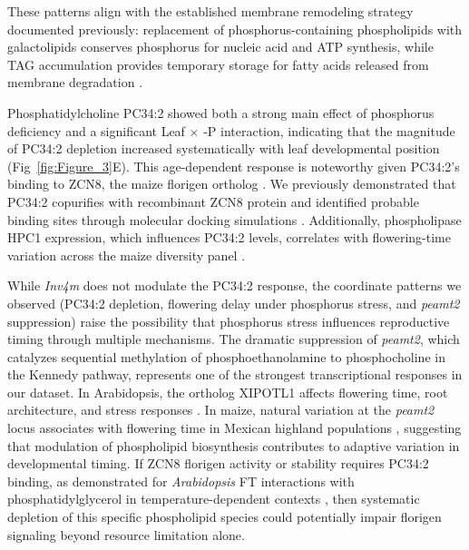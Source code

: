\documentclass[9pt,twocolumn,twoside]{rilabRxiv}
\newcommand{\invfour}{\textit{Inv4m}\xspace}
\begin{document}
These patterns align with the established membrane remodeling strategy documented previously: replacement of phosphorus-containing phospholipids with galactolipids conserves phosphorus for nucleic acid and ATP synthesis, while TAG accumulation provides temporary storage for fatty acids released from membrane degradation \cite{wang2020a}.

Phosphatidylcholine PC34:2 showed both a strong main effect of phosphorus deficiency and a significant Leaf $\times$ -P interaction, indicating that the magnitude of PC34:2 depletion increased systematically with leaf developmental position (Fig~\ref{fig:Figure_3}E).
This age-dependent response is noteworthy given PC34:2's binding to ZCN8, the maize florigen ortholog \cite{barnes2022}.
We previously demonstrated that PC34:2 copurifies with recombinant ZCN8 protein and identified probable binding sites through molecular docking simulations \cite{barnes2022}.
Additionally, phospholipase HPC1 expression, which influences PC34:2 levels, correlates with flowering-time variation across the maize diversity panel \cite{barnes2022}.

While \invfour does not modulate the PC34:2 response, the coordinate patterns we observed (PC34:2 depletion, flowering delay under phosphorus stress, and \textit{peamt2} suppression) raise the possibility that phosphorus stress influences reproductive timing through multiple mechanisms.
The dramatic suppression of \textit{peamt2}, which catalyzes sequential methylation of phosphoethanolamine to phosphocholine in the Kennedy pathway, represents one of the strongest transcriptional responses in our dataset.
In Arabidopsis, the ortholog XIPOTL1 affects flowering time, root architecture, and stress responses \cite{cruz-ramirez2004}.
In maize, natural variation at the \textit{peamt2} locus associates with flowering time in Mexican highland populations \cite{perez-limon2022,barnes2022}, suggesting that modulation of phospholipid biosynthesis contributes to adaptive variation in developmental timing.
If ZCN8 florigen activity or stability requires PC34:2 binding, as demonstrated for \textit{Arabidopsis} FT interactions with phosphatidylglycerol in temperature-dependent contexts \cite{susila2021}, then systematic depletion of this specific phospholipid species could potentially impair florigen signaling beyond resource limitation alone.
\end{document}
